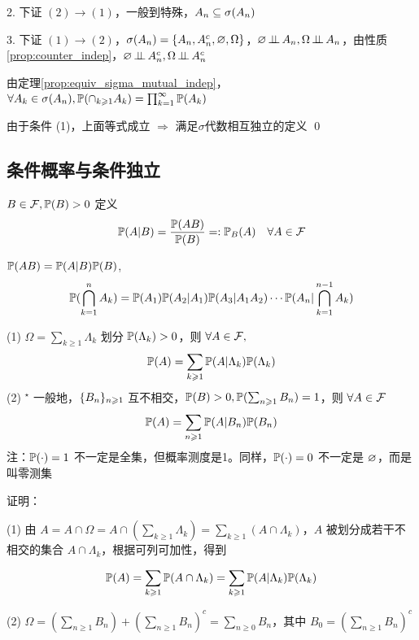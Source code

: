 2. 下证 $(2)\rightarrow (1)$，一般到特殊，$A_n\subseteq \sigma(A_n)$

3. 下证 $(1)\rightarrow (2)$，$\sigma(A_n)=\{A_n,A_n^c, \varnothing, \Omega\}$，$\varnothing\operatorname{\perp\!\!\!\perp} A_n, \Omega\operatorname{\perp\!\!\!\perp} A_n$，由性质\ref{prop:counter_indep}，$\varnothing\operatorname{\perp\!\!\!\perp} A_n^c, \Omega\operatorname{\perp\!\!\!\perp} A_n^c$

由定理\ref{prop:equiv_sigma_mutual_indep}，$\forall A_k\in \sigma(A_n), \mathbb{P}(\cap_{k\geqslant 1}A_k)=\prod_{k=1}^{\infty}\mathbb{P}(A_k)$

由于条件 (1)，上面等式成立 $\Rightarrow$ 满足$\sigma$代数相互独立的定义 \qed

\subsection{条件概率与条件独立}

\begin{definition}[条件概率]\label{def:con_prob}
    $B\in \mathcal{F}, \mathbb{P}(B)>0$ 定义
    \[
    \mathbb{P}(A|B)=\frac{\mathbb{P}(AB)}{\mathbb{P}(B)}=: \mathbb{P}_B(A)\quad \forall A\in \mathcal{F}
    \]
\end{definition}

\begin{theorem}[乘法公式]\label{thm:multiply_func}
    $\mathbb{P}(AB)=\mathbb{P}(A|B)\mathbb{P}(B)$,
    \begin{equation}
    \mathbb{P}(\bigcap_{k=1}^{n}A_k)=\mathbb{P}(A_1)\mathbb{P}(A_2|A_1)\mathbb{P}(A_3|A_1A_2)\cdots \mathbb{P}(A_n|\bigcap_{k=1}^{n-1}A_k)
		\label{eq:multiply_func}
		\end{equation}
\end{theorem}

\begin{theorem}[全概公式]\label{thm:law_total_prob}
    (1) $\Omega=\sum_{k\geq 1}\Lambda_k$ 划分 $\mathbb{P}(\Lambda_k)>0$，则 $\forall A\in \mathcal{F},$
    \[
    \mathbb{P}(A)=\sum_{k\geqslant 1}\mathbb{P}(A|\Lambda_k)\mathbb{P}(\Lambda_k)
    \]
    (2) $^\star$ 一般地，$\{{B}_{n}\}_{n \geqslant 1}$ 互不相交，$\mathbb{P}(B)>0, \mathbb{P}(\sum_{n\geqslant 1}B_n)=1$，则 $\forall A\in \mathcal{F}$
    \[
    \mathbb{P}(A)=\sum_{n\geqslant 1}\mathbb{P}(A|B_n)\mathbb{P}(B_n)
    \]
    注：$\mathbb{P}(\cdot)=1$ 不一定是全集，但概率测度是1。同样，$\mathbb{P}(\cdot)=0$ 不一定是 $\varnothing$，而是叫零测集
\end{theorem}

证明：

(1) 由 $A=A\cap\Omega=A\cap (\sum_{k\geq 1}\Lambda_k)=\sum_{k\geq 1}(A\cap \Lambda_k)$，$A$ 被划分成若干不相交的集合 $A\cap \Lambda_k$，根据可列可加性，得到 

\[
\mathbb{P}(A)=\sum_{k\geqslant 1}\mathbb{P}(A\cap \Lambda_k)=\sum_{k\geqslant 1}\mathbb{P}(A|\Lambda_k)\mathbb{P}(\Lambda_k)
\]

(2) $\Omega=(\sum_{n\geq 1}B_n)+(\sum_{n\geq 1}B_n)^c=\sum_{n\geq 0}B_n$，其中 $B_0=(\sum_{n\geq 1}B_n)^c$

